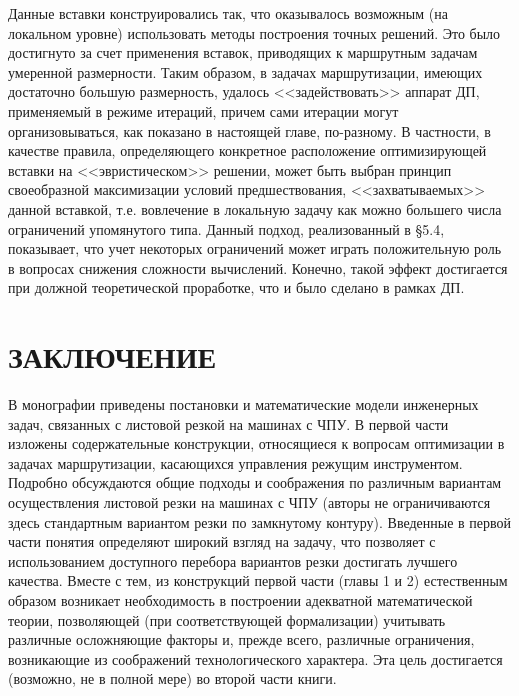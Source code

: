 \documentclass[11pt,twoside,openany]{report}
\begin{document}
{{Данные вставки конструировались так, что оказывалось возможным (на локальном уровне)
использовать методы построения точных решений. Это было достигнуто за счет применения
вставок, приводящих к маршрутным задачам умеренной размерности. Таким образом, в
задачах маршрутизации, имеющих достаточно большую размерность, удалось
<<задействовать>> аппарат ДП, применяемый в режиме итераций, причем сами итерации
могут организовываться, как показано в настоящей главе, по-разному. В частности, в
качестве правила, определяющего конкретное расположение оптимизирующей вставки на
<<эвристическом>> решении, может быть выбран принцип своеобразной максимизации условий
предшествования, <<захватываемых>> данной вставкой, т.е. вовлечение в локальную задачу
как можно большего числа ограничений упомянутого типа. Данный подход, реализованный
в \S 5.4, показывает, что учет некоторых ограничений может играть положительную роль
в вопросах снижения сложности вычислений. Конечно, такой эффект достигается при должной
теоретической проработке, что и было сделано в рамках ДП.

\chapter*{ЗАКЛЮЧЕНИЕ}

В монографии приведены постановки и математические модели инженерных задач,
связанных с листовой резкой на машинах с ЧПУ.
В первой части изложены содержательные конструкции,
относящиеся к вопросам оптимизации в задачах маршрутизации,
касающихся управления режущим инструментом.
Подробно обсуждаются общие подходы и соображения
по различным вариантам осуществления листовой резки на машинах с ЧПУ
(авторы не ограничиваются здесь стандартным вариантом резки по замкнутому контуру).
Введенные в первой части понятия определяют широкий взгляд на задачу,
что позволяет с использованием доступного перебора вариантов резки достигать лучшего качества.
Вместе с тем, из конструкций первой части (главы 1 и 2)
естественным образом возникает необходимость в построении адекватной математической теории,
позволяющей
(при соответствующей формализации)
учитывать различные осложняющие факторы и,
прежде всего, различные ограничения,
возникающие из соображений технологического характера.
Эта цель достигается
(возможно, не в полной мере)
во второй части книги.

}}
\end{document}
